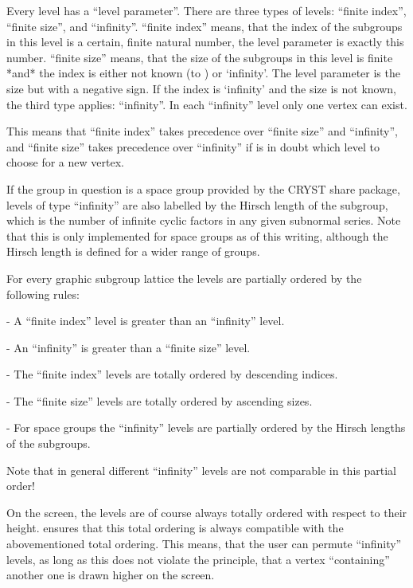 Every level has a ``level parameter''.
There are three types of levels: ``finite index'', ``finite size'', and 
``infinity''. ``finite index'' means, that the index of the subgroups
in this level is a certain, finite natural number, the level parameter 
is exactly this number. ``finite size'' means, that the size of the
subgroups in this level is finite *and* the index is either not known
(to {\GAP}) or `infinity'. The level parameter is the size but with a
negative sign. If the index is `infinity' and the size is
not known, the third type applies: ``infinity''. In each ``infinity''
level only one vertex can exist.

This means that ``finite index'' takes precedence over ``finite size'' 
and ``infinity'', and ``finite size'' takes precedence over
``infinity'' if {\XGAP} is in doubt which level to choose for a new
vertex. 

If the group in question is a space group provided by the CRYST share
package, levels of type ``infinity'' are also labelled by the Hirsch 
length of the subgroup, which is the number of infinite cyclic factors
in any given subnormal series. Note that this is only implemented for 
space groups as of this writing, although the Hirsch length is defined for
a wider range of groups.

For every graphic subgroup lattice the levels are partially ordered by
the following rules:

 - A ``finite index'' level is greater than an ``infinity'' level.

 - An ``infinity'' is greater than a ``finite size'' level.

 - The ``finite index'' levels are totally ordered by descending indices.

 - The ``finite size'' levels are totally ordered by ascending sizes. 

 - For space groups the ``infinity'' levels are partially ordered by
     the Hirsch lengths of the subgroups.

Note that in general different ``infinity'' levels are not comparable in this
partial order!

On the screen, the levels are of course always totally ordered with respect
to their height. {\XGAP} ensures that this total ordering is always
compatible with the abovementioned total ordering. This means, that the
user can permute ``infinity'' levels, as long as this does not violate the
principle, that a vertex ``containing'' another one is drawn higher on
the screen.

